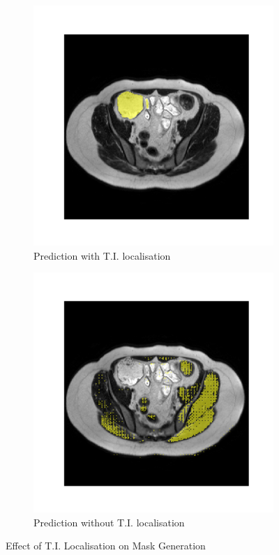 \begin{figure}[htp]
\begin{subfigure}[b]{0.47\textwidth}
\includegraphics[width=\textwidth]{./figures/ablation_medsam.png}
\caption{Prediction with T.I. localisation}
\label{fig:2}
\end{subfigure}
\hfill
\begin{subfigure}[b]{0.47\textwidth}
\centering
\includegraphics[width=\textwidth]{./figures/ablation_without_loc.png}
\caption{Prediction without T.I. localisation}
\label{fig:3}
\end{subfigure}
\caption{Effect of T.I. Localisation on Mask Generation}
\label{fig:4}
\end{figure}

